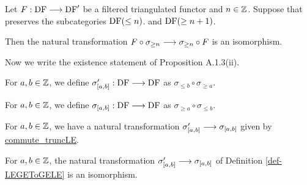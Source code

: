 \begin{proposition}
\label{prop-commute_truncGE_iso}
\leanok
{}

Let $F:\operatorname{DF}\longrightarrow\operatorname{DF}'$ be a filtered triangulated functor
and $n\in\mathbb{Z}$. Suppose that preserves the subcategories $\operatorname{DF}(\le n)$.
and $\operatorname{DF}(\ge n + 1)$.

Then the natural transformation
$F \circ\sigma_{\ge n} \longrightarrow \sigma_{\ge n} \circ F$ is an isomorphism.

\end{proposition}

Now we write the existence statement of Proposition A.1.3(ii).

\begin{definition}
\label{def-truncLEGE}
\leanok
{}

For $a,b\in\mathbb{Z}$, we define $\sigma'_{[a,b]} : \operatorname{DF}\longrightarrow\operatorname{DF}$ as $\sigma_{\leq b}\circ\sigma_{\geq a}$.

\end{definition}

\begin{definition}
\label{def-truncGELE}
\leanok
{}

For $a,b\in\mathbb{Z}$, we define $\sigma_{[a,b]} : \operatorname{DF}\longrightarrow\operatorname{DF}$ as $\sigma_{\geq a}\circ\sigma_{\leq b}$.

\end{definition}

\begin{definition}
\label{def-LEGEToGELE}
\leanok
{}

For $a,b\in\mathbb{Z}$, we have a natural transformation $\sigma'_{[a,b]} \longrightarrow\sigma_{[a,b]}$ given by \url{commute_truncLE}.

\end{definition}

\begin{definition}
\label{def-LEGEToGELE_iso}
\leanok
{}

For $a,b\in\mathbb{Z}$, the natural transformation $\sigma'_{[a,b]} \longrightarrow\sigma_{[a,b]}$ of Definition \ref{def-LEGEToGELE} is an isomorphism.

\end{definition}

